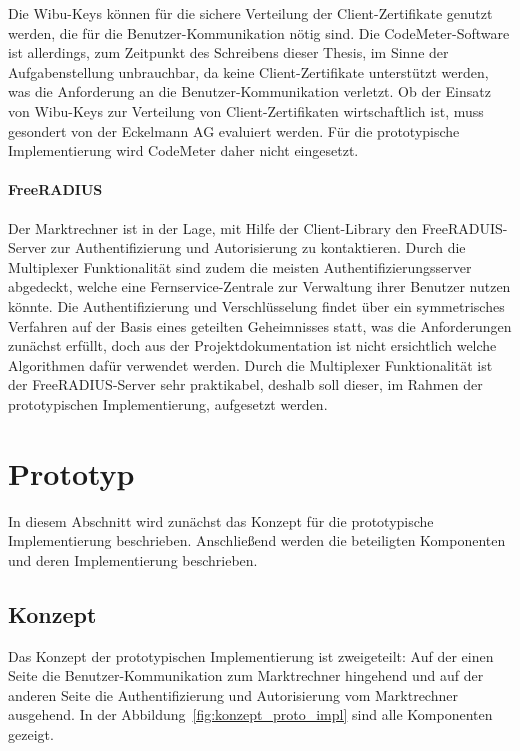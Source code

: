 \documentclass[11pt,a4paper]{report}
\begin{document}
Die Wibu-Keys können für die sichere Verteilung der Client-Zertifikate genutzt werden, die für die Benutzer-Kommunikation nötig sind. Die CodeMeter-Software ist allerdings, zum Zeitpunkt des Schreibens dieser Thesis, im Sinne der Aufgabenstellung unbrauchbar, da keine Client-Zertifikate unterstützt werden, was die Anforderung an die Benutzer-Kommunikation verletzt. Ob der Einsatz von Wibu-Keys zur Verteilung von Client-Zertifikaten wirtschaftlich ist, muss gesondert von der Eckelmann AG evaluiert werden. Für die prototypische Implementierung wird CodeMeter daher nicht eingesetzt.

\paragraph{FreeRADIUS}

Der Marktrechner ist in der Lage, mit Hilfe der Client-Library den FreeRADUIS-Server zur Authentifizierung und Autorisierung zu kontaktieren. Durch die Multiplexer Funktionalität sind zudem die meisten Authentifizierungsserver abgedeckt, welche eine Fernservice-Zentrale zur Verwaltung ihrer Benutzer nutzen könnte. Die Authentifizierung und Verschlüsselung findet über ein symmetrisches Verfahren auf der Basis eines geteilten Geheimnisses statt, was die Anforderungen zunächst erfüllt, doch aus der Projektdokumentation ist nicht ersichtlich welche Algorithmen dafür verwendet werden. Durch die Multiplexer Funktionalität ist der FreeRADIUS-Server sehr praktikabel, deshalb soll dieser, im Rahmen der prototypischen Implementierung, aufgesetzt werden.

\section{Prototyp}

In diesem Abschnitt wird zunächst das Konzept für die prototypische Implementierung beschrieben. Anschließend werden die beteiligten Komponenten und deren Implementierung beschrieben.

\subsection{Konzept}

Das Konzept der prototypischen Implementierung ist zweigeteilt: Auf der einen Seite die Benutzer-Kommunikation zum Marktrechner hingehend und auf der anderen Seite die Authentifizierung und Autorisierung vom Marktrechner ausgehend. In der Abbildung~\ref{fig:konzept_proto_impl} sind alle Komponenten gezeigt.
\end{document}

